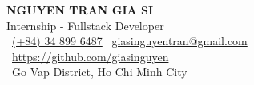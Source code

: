 \documentclass[a4paper,11pt]{article}
\begin{document}
\begin{center}
    {\fontsize{24pt}{28pt}\selectfont\bfseries NGUYEN TRAN GIA SI} \\[8pt]
    {\fontsize{14pt}{16pt}\selectfont Internship - Fullstack Developer} \\[8pt]
    \faPhone\ \href{tel:+84348996487}{(+84) 34 899 6487} \enspace
    \faEnvelope\ \href{mailto:giasinguyentran@gmail.com}{giasinguyentran@gmail.com} \enspace
    \faLink\ \href{https://github.com/giasinguyen}{https://github.com/giasinguyen} \\[4pt]
    \faMapMarker*\ Go Vap District, Ho Chi Minh City
\end{center}

\vspace{-2pt}





\newpage



\end{document}
